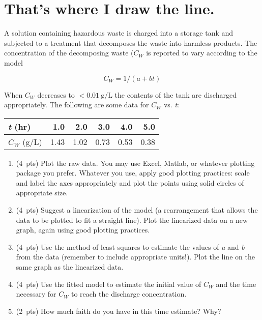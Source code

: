 \documentclass[11pt]{article}
\begin{document}
\section{That's where I draw the line.}
\label{sec-3}
A solution containing hazardous waste is charged into a storage tank and subjected to a treatment that decomposes the waste into harmless products.  The concentration of the decomposing waste (\(C_{W}\) is reported to vary according to the model

\[ C_{W} = 1/(a + bt) \]

\noindent When \(C_{W}\) decreases to \(< \SI{0.01}{\g\per\L}\) the contents of the tank are discharged appropriately.  The following are some data for \(C_{W}\) vs. \emph{t}:

\begin{center}
\begin{tabular}{lrrrrr}
\emph{t} (hr) & 1.0 & 2.0 & 3.0 & 4.0 & 5.0\\
\hline
\(C_{W}\) (g/L) & 1.43 & 1.02 & 0.73 & 0.53 & 0.38\\
\end{tabular}
\end{center}

\begin{enumerate}
\item (4~pts) Plot the raw data.  You may use Excel, Matlab, or whatever
plotting package you prefer.  Whatever you use, apply good plotting
practices: scale and label the axes appropriately and plot the points using
solid circles of appropriate size.
\item (4~pts) Suggest a linearization of the model (a rearrangement that allows the data to
be plotted to fit a straight line).  Plot the linearized data on a new graph,
again using good plotting practices.
\item (4~pts) Use the method of least squares to estimate the values of \emph{a}
and \emph{b} from the data (remember to include appropriate units!).  Plot the
line on the same graph as the linearized data.
\item (4~pts) Use the fitted model to estimate the initial value of \(C_{W}\)
   and the time necessary for \(C_{W}\) to reach the discharge concentration.
\item (2~pts) How much faith do you have in this time estimate?  Why?
\end{enumerate}
\end{document}
